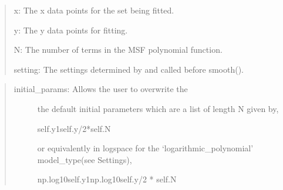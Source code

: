 \documentclass[letterpaper,10pt,english]{sphinxmanual}
\begin{document}
\begin{fulllineitems}
\label{\detokenize{source/maxsmooth:maxsmooth.msf.smooth}}
\begin{quote}

x:  The x data points for the set being fitted.

y:  The y data points for fitting.

N:  The number of terms in the MSF polynomial function.

setting:  The settings determined by
 and called before smooth().
\end{quote}

\begin{quote}
\begin{description}
\item[{initial\_params:  Allows the user to overwrite the}] \leavevmode
the default initial parameters which are a list of length N given
by,

\begin{sphinxVerbatim}[commandchars=\\\{\}]
  \PYG{o}{[}self.y\PYG{o}{[}\PYGZhy{}1\PYG{o}{]}\PYGZhy{}self.y\PYG{o}{[}\PYG{o}{]}/2\PYG{o}{]}*self.N
\end{sphinxVerbatim}

or equivalently in log\sphinxhyphen{}space for the ‘logarithmic\_polynomial’
model\_type(see Settings),

\begin{sphinxVerbatim}[commandchars=\\\{\}]
  \PYG{o}{[}np.log10self.y\PYG{o}{[}\PYGZhy{}1\PYG{o}{]}\PYGZhy{}np.log10self.y\PYG{o}{[}\PYG{o}{]}/2\PYG{o}{]} *
    self.N
\end{sphinxVerbatim}

\end{description}
\end{quote}

\end{fulllineitems}
\end{document}
